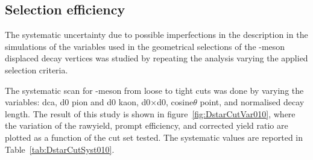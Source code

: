 






\clearpage
\subsection{Selection efficiency}
\label{sec:eff_syst}
The systematic uncertainty due to possible imperfections in the description in the simulations of the
variables used in the geometrical selections of the \Dstar -meson displaced decay vertices was studied by
repeating the analysis varying the applied selection criteria.



The systematic scan for \Dstar -meson from loose to tight cuts was done by varying the variables: dca, d0 pion and d0 kaon, d0$\times$d0, cosine$\theta$ point, and normalised decay length. The result of this study is shown in figure~\ref{fig:DstarCutVar010}, where the variation of the rawyield, prompt efficiency, and corrected yield ratio are plotted as a function of the cut set tested. The systematic values are reported in Table~\ref{tab:DstarCutSyst010}.

